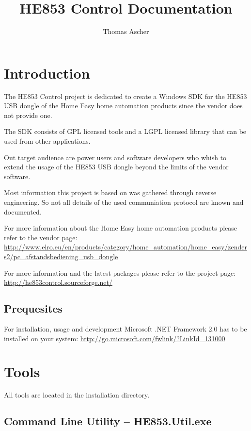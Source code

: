 \documentclass[
a4paper,
oneside,
halfparskip*,
normalheadings,
]
{scrbook}
\begin{document}
\title{HE853 Control Documentation}
\author{Thomas Ascher}
\maketitle
\tableofcontents
\mainmatter

\chapter{Introduction}

The HE853 Control project is dedicated to create a Windows SDK for the HE853 USB
dongle of the Home Easy home automation products since the vendor does not provide
one.

The SDK consists of GPL licensed tools and a LGPL licensed library that can be
used from other applications.

Out target audience are power users and software developers who whish to extend the
usage of the HE853 USB dongle beyond the limits of the vendor software.

Most information this project is based on was gathered through reverse engineering.
So not all details of the used communiation protocol are known and documented.

For more information about the Home Easy home automation products please refer to
the vendor page: \url{http://www.elro.eu/en/products/category/home_automation/home_easy/zenders2/pc_afstandsbediening_usb_dongle}

For more information and the latest packages please refer to the project page:
\url{http://he853control.sourceforge.net/}

\section{Prequesites}
For installation, usage and development Microsoft .NET Framework 2.0 has to be installed on
your system: \url{http://go.microsoft.com/fwlink/?LinkId=131000}




\chapter{Tools}

All tools are located in the installation directory. 

\section{Command Line Utility -- HE853.Util.exe}
\end{document}
